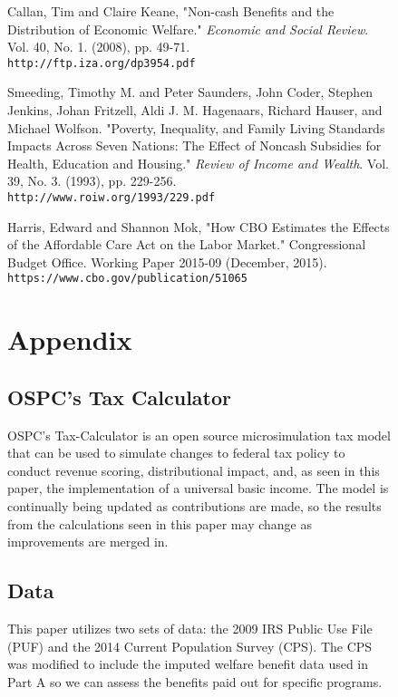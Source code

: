 \documentclass{article}
\begin{document}
\begin{figure}[H]
\begin{thebibliography}{1}
 Callan, Tim and Claire Keane, "Non-cash Benefits and the Distribution of Economic Welfare." \textit{Economic and Social Review}. Vol. 40, No. 1. (2008), pp. 49-71.\\ \texttt{http://ftp.iza.org/dp3954.pdf} 

 Smeeding, Timothy M. and Peter Saunders, John Coder, Stephen Jenkins, Johan Fritzell, Aldi J. M. Hagenaars, Richard Hauser, and Michael Wolfson. "Poverty, Inequality, and Family Living Standards Impacts Across Seven Nations: The Effect of Noncash Subsidies for Health, Education and Housing." \textit{Review of Income and Wealth}. Vol. 39, No. 3. (1993), pp. 229-256.\\ \texttt{http://www.roiw.org/1993/229.pdf}

 Harris, Edward and Shannon Mok, "How CBO Estimates the Effects of the Affordable Care Act on the Labor Market." Congressional Budget Office. Working Paper 2015-09 (December, 2015).\\ \texttt{https://www.cbo.gov/publication/51065}

\end{thebibliography}
 
\newpage
\section{Appendix}

\subsection{OSPC's Tax Calculator}
OSPC’s Tax-Calculator is an open source microsimulation tax model that can be used to simulate changes to federal tax policy to conduct revenue scoring, distributional impact, and, as seen in this paper, the implementation of a universal basic income. The model is continually being updated as contributions are made, so the results from the calculations seen in this paper may change as improvements are merged in.

\subsection{Data}
This paper utilizes two sets of data: the 2009 IRS Public Use File (PUF) and the 2014 Current Population Survey (CPS). The CPS was modified to include the imputed welfare benefit data used in Part A so we can assess the benefits paid out for specific programs.


\end{figure}
\end{document}
